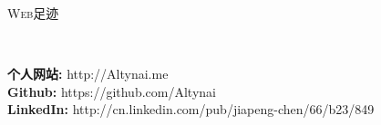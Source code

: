 ﻿\documentclass[9pt]{article}
\newenvironment{changemargin}[2]{%
  \begin{list}{}{%
    \setlength{\topsep}{0pt}%
    \setlength{\leftmargin}{#1}%
    \setlength{\rightmargin}{#2}%
    \setlength{\listparindent}{\parindent}%
    \setlength{\itemindent}{\parindent}%
    \setlength{\parsep}{\parskip}%
  }%
  \item[]}{\end{list}
}
\newcommand{\lineover}{
	\begin{changemargin}{-0.05in}{-0.05in}
		\vspace*{-8pt}
		\hrulefill \\
		\vspace*{-2pt}
	\end{changemargin}
}
\newcommand{\header}[1]{
	\begin{changemargin}{-0.5in}{-0.5in}
		\scshape{#1}\\
  	\lineover
	\end{changemargin}
}
\newenvironment{body} {
	\vspace*{-16pt}
	\begin{changemargin}{-0.25in}{-0.5in}
  }	
	{\end{changemargin}
}
\begin{document}
\smallskip

\header{Web足迹}

\begin{body}
	\vspace{14pt}
    \textbf{个人网站:} http://Altynai.me \\
    \textbf{Github:} https://github.com/Altynai \\
    \textbf{LinkedIn:} http://cn.linkedin.com/pub/jiapeng-chen/66/b23/849\\
\end{body}
\end{document}
